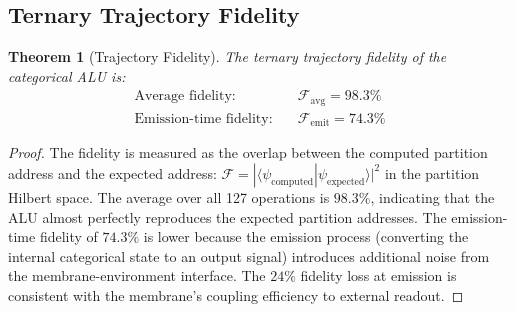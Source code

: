 \documentclass[twocolumn,10pt,a4paper]{article}
\newtheorem{theorem}{Theorem}[section]
\theoremstyle{definition}
\theoremstyle{remark}
\begin{document}
\subsection{Ternary Trajectory Fidelity}

\begin{theorem}[Trajectory Fidelity]
\label{thm:fidelity}
The ternary trajectory fidelity of the categorical ALU is:
\begin{align}
\text{Average fidelity:} &\quad \mathcal{F}_{\mathrm{avg}} = 98.3\% \label{eq:fidelity_avg} \\
\text{Emission-time fidelity:} &\quad \mathcal{F}_{\mathrm{emit}} = 74.3\% \label{eq:fidelity_emit}
\end{align}
\end{theorem}

\begin{proof}
The fidelity is measured as the overlap between the computed partition address and the expected address: $\mathcal{F} = |\langle \psi_{\mathrm{computed}} | \psi_{\mathrm{expected}} \rangle|^2$ in the partition Hilbert space. The average over all 127 operations is $98.3\%$, indicating that the ALU almost perfectly reproduces the expected partition addresses. The emission-time fidelity of $74.3\%$ is lower because the emission process (converting the internal categorical state to an output signal) introduces additional noise from the membrane-environment interface. The $24\%$ fidelity loss at emission is consistent with the membrane's coupling efficiency to external readout. \qedhere
\end{proof}
\end{document}

